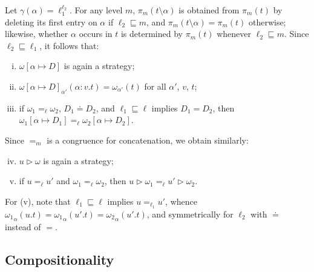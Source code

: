 \documentclass[preprint,5p,twocolumn]{elsarticle}
\begin{document}
Let $\gamma(\alpha) = \ell_1^{\ell_2}$. For any level $m$, $\pi_m(t \setminus \alpha)$ is obtained
from $\pi_m(t)$ by deleting its first entry on $\alpha$ if $\ell_2 \sqsubseteq m$, and
$\pi_m(t\setminus\alpha) = \pi_m(t)$ otherwise; likewise, whether $\alpha$ occurs in $t$ is
determined by $\pi_m(t)$ whenever $\ell_2 \sqsubseteq m$. Since $\ell_2 \sqsubseteq \ell_1$, it
follows that:
\begin{enumerate}[(i)]
\item $\omega[\alpha \mapsto D]$ is again a strategy;
\item ${\omega[\alpha \mapsto D]}_{\alpha'}(\alpha : v.t) = {\omega}_{\alpha'}(t)$ for all $\alpha'$, $v$, $t$;
\item if $\omega_1 =_\ell \omega_2$, $D_1 \doteq D_2$, and $\ell_1 \sqsubseteq \ell$ implies
  $D_1 = D_2$, then $\omega_1[\alpha \mapsto D_1] =_\ell \omega_2[\alpha \mapsto D_2]$.
\end{enumerate}
Since $=_m$ is a congruence for concatenation, we obtain similarly:
\begin{enumerate}[(i)]\setcounter{enumi}{3}
\item $u \triangleright \omega$ is again a strategy;
\item if $u =_\ell u'$ and $\omega_1 =_\ell \omega_2$, then
  $u \triangleright \omega_1 =_\ell u' \triangleright \omega_2$.
\end{enumerate}
For (v), note that $\ell_1 \sqsubseteq \ell$ implies $u =_{\ell_1} u'$, whence
${\omega_1}_{\alpha}(u.t) = {\omega_1}_{\alpha}(u'.t) = {\omega_2}_{\alpha}(u'.t)$, and
symmetrically for $\ell_2$ with $\doteq$ instead of $=$.

\subsection{Compositionality}
\end{document}

